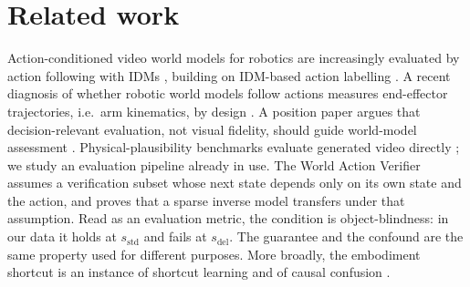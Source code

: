 \documentclass[10pt]{article}
\newcommand{\sstd}{s_{\mathrm{std}}}
\newcommand{\sdel}{s_{\mathrm{del}}}
\begin{document}
\section{Related work}
Action-conditioned video world models for robotics
\citep{yang2024unisim,du2023unipi,bruce2024genie,nvidia2025cosmos,zhu2024irasim} are
increasingly evaluated by action following with IDMs \citep{multiworld2026}, building on
IDM-based action labelling \citep{baker2022vpt,ye2024lapa}. A recent diagnosis of whether
robotic world models follow actions measures end-effector trajectories, i.e.\ arm
kinematics, by design \citep{followactions2026}. A position paper argues that
decision-relevant evaluation, not visual fidelity, should guide world-model assessment
\citep{pipeline2026}. Physical-plausibility benchmarks evaluate generated video directly
\citep{bear2021physion,kang2024phyworld,bansal2024videophy,motamed2025physicsiq}; we
study an evaluation pipeline already in use. The World Action Verifier \citep{wav2026}
assumes a verification subset whose next state depends only on its own state and the
action, and proves that a sparse inverse model transfers under that assumption. Read as
an evaluation metric, the condition is object-blindness: in our data it holds at $\sstd$
and fails at $\sdel$. The guarantee and the confound are the same property used for
different purposes. More broadly, the embodiment shortcut is an instance of shortcut
learning \citep{geirhos2020shortcut,lapuschkin2019cleverhans} and of causal confusion
\citep{dehaan2019causal}.
\end{document}
